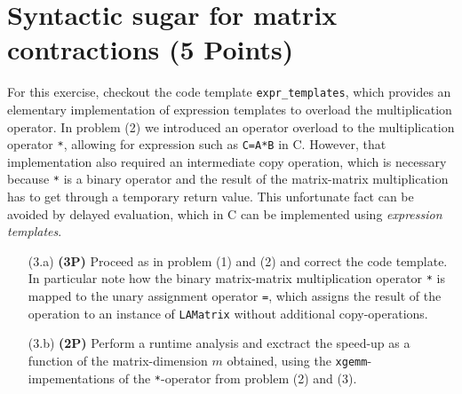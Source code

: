 \documentclass[a4paper, 12pt]{article}
\newcommand\Cpp{C\nolinebreak[4]\hspace{-.05em}\raisebox{.4ex}{\relsize{-3}{\textbf{++}}}}
\begin{document}
\section{Syntactic sugar for matrix contractions \textbf{(5 Points)}}
%
For this exercise, checkout the code template \texttt{expr\_templates}, which provides an elementary implementation of expression templates to overload the multiplication operator.
%
In problem (2) we introduced an operator overload to the multiplication operator \texttt{*}, allowing for expression such as \texttt{C=A*B} in \Cpp.
%
However, that implementation also required an intermediate copy operation, which is necessary because \texttt{*} is a binary operator and the result of the matrix-matrix multiplication has to get through a temporary return value.
%
This unfortunate fact can be avoided by delayed evaluation, which in \Cpp{} can be implemented using \textit{expression templates}.
%
\begin{itemize}
	\item[(3.a)] \textbf{(3P)}
	Proceed as in problem (1) and (2) and correct the code template.
	In particular note how the binary matrix-matrix multiplication operator \texttt{*} is mapped to the unary assignment operator \texttt{=}, which assigns the result of the operation to an instance of \texttt{LAMatrix} without additional copy-operations.
	\item[(3.b)] \textbf{(2P)}
	Perform a runtime analysis and exctract the speed-up as a function of the matrix-dimension $m$ obtained, using the \texttt{xgemm}-impementations of the \texttt{*}-operator from problem (2) and (3).
\end{itemize}
%
\batchmode  %
\end{document}

